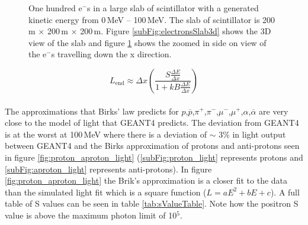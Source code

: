 \begin{figure}[!h]
\begin{subfigure}{.5\textwidth}
  \captionsetup{width=.9\linewidth}
  \caption{}
  \label{subFig:electronsSlabSideOn}
\end{subfigure}
\caption{One hundred e$^-$s in a large slab of scintillator with a generated kinetic energy from 0\,MeV -- 100\,MeV. The slab of scintillator is 200\,m $\times$ 200\,m $\times$ 200\,m. Figure \ref{subFig:electronsSlab3d} shows the 3D view of the slab and figure \ref{subFig:electronsSlabSideOn} shows the zoomed in side on view of the e$^-$s travelling down the x direction.}
\label{fig:electrons_viewed_in_slab}
\end{figure}

\begin{equation}
L_{\textrm{end}}\approx \Delta x \left(\frac{S\frac{\Delta E}{\Delta x}}{1 + kB \frac{\Delta E}{\Delta x}}\right) 
\label{equ:light_produced}
\end{equation}
\\The approximations that Birks' law predicts for $p$,$\overline{p}$,$\pi^+$,$\pi^-$,$\mu^-$,$\mu^+$,$\alpha$,$\overline{\alpha}$ are very close to the model of light that GEANT4 predicts. The deviation from GEANT4 is at the worst at 100\,MeV where there is a deviation of $\sim$ $3\%$ in light output between GEANT4 and the Birks approximation of protons and anti-protons seen in figure \ref{fig:proton_aproton_light} (\ref{subFig:proton_light} represents protons and \ref{subFig:aproton_light} represents anti-protons). In figure \ref{fig:proton_aproton_light} the Brik's approximation is a closer fit to the data than the simulated light fit which is a square function ($L = aE^2 + bE+ c$). A full table of S values can be seen in table \ref{tab:sValueTable}. Note how the positron S value is above the maximum photon limit of 10$^5$. 


